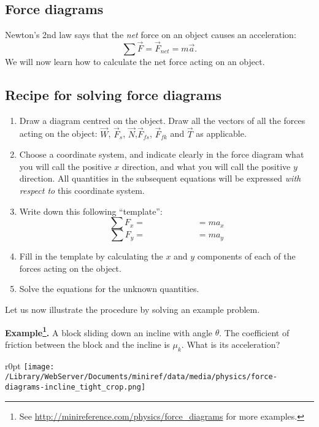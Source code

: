 \documentclass[letterpaper,9pt,journal]{IEEEtran}
\newcommand{\be}{\begin{equation}}
\newcommand{\ee}{\end{equation}}
\begin{document}
\subsection{Force diagrams}

Newton's 2nd law says that the \emph{net} force on an object causes an acceleration:
\be
 \sum \vec{F}=\vec{F}_{net} = m\vec{a}.
 \label{FeqMA}
\ee
We will now learn how to calculate the net force acting on an object.

\vspace{-3mm}
\subsection{Recipe for solving force diagrams}
\label{31bb2b3f8fca76563afa16cf8fbccb90}%

\begin{enumerate}
\item  Draw a diagram centred on the object. Draw all the vectors of all the forces acting on the object:
    $\vec{W}$, $\vec{F}_{s}$, $\vec{N}$,$\vec{F}_{fs}$, $\vec{F}_{fk}$ and  $\vec{T}$ as applicable.
\item  Choose a coordinate system, and indicate clearly in the force diagram what you will call the positive $x$ direction, 
and what you will call the positive $y$ direction. All quantities in the subsequent equations will be expressed \emph{with respect to} this coordinate system.
\item  Write down this following ``template'': \[ \sum F_x = \qquad \qquad \qquad = ma_x \]   \[ \sum F_y = \qquad \qquad \qquad = ma_y \]
\item   Fill in the template by calculating the $x$ and $y$ components of each of the forces acting on the object.
\item  Solve the equations for the unknown quantities.
\end{enumerate}

Let us now illustrate the procedure by solving an example problem.

{\bf Example\footnote{See \url{http://minireference.com/physics/force_diagrams} for more examples.}. }
A block sliding down an incline with angle $\theta$. The coefficient of friction between the block and the incline is  $\mu_k$.
What is its acceleration?

\begin{wrapfigure}{r}{0pt}
\centering
\texttt{[image: /Library/WebServer/Documents/miniref/data/media/physics/force-diagrams-incline\_tight\_crop.png]}
\end{wrapfigure}
\end{document}
